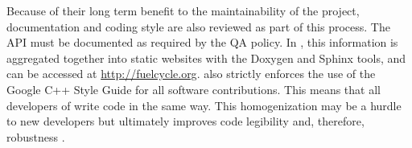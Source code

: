 Because of their long term benefit to the maintainability of the project, 
documentation and coding style are also reviewed as part of this process.  The 
\gls{API} must be documented as required by the \Cyclus \gls{QA} policy.  In 
\Cyclus, this information is aggregated together into static websites with the 
Doxygen \cite{van_heesch_doxygen:_2008} and Sphinx \cite{brandl_sphinx_2014} 
tools, and can be accessed at \url{http://fuelcycle.org}. \Cyclus also strictly 
enforces the use of the Google C++ Style Guide \cite{weinberger_google_2008} 
for all software contributions.  This means that all developers of \Cyclus 
write \Cyclus code in the same way.  This homogenization may be a hurdle to new 
developers but ultimately improves code legibility and, therefore, robustness 
\cite{cohen_modern_2010}.

